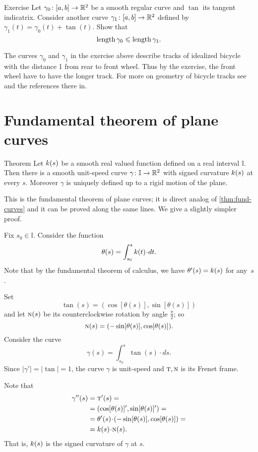 \begin{thm}{Exercise}\label{ex:bike}
Let $\gamma_0\colon[a,b]\to\mathbb{R}^2$ be a smooth regular curve and $\tan$ its tangent indicatrix.
Consider another curve $\gamma_1\colon[a,b]\to\mathbb{R}^2$ defined by $\gamma_1(t)=\gamma_0(t)+\tan(t)$.
Show that
\[\mathop{\rm length}\nolimits\gamma_0\leqslant \mathop{\rm length}\nolimits\gamma_1.\]

\end{thm}

The curves $\gamma_0$ and $\gamma_1$ in the exercise above describe tracks of idealized bicycle with the distance 1 from rear to front wheel.
Thus by the exercise, the front wheel have to have the longer track.
For more on geometry of bicycle tracks see \cite{FLT} and the references there in.

\section*{Fundamental theorem of plane curves}

\begin{thm}{Theorem}\label{thm:fund-curves-2D}
Let $k(s)$ be a smooth real valued function defined on a real interval $\mathbb{I}$.
Then there is a smooth unit-speed curve $\gamma\colon\mathbb{I}\to\mathbb{R}^2$ with signed curvature $k(s)$ at every $s$.
Moreover $\gamma$ is uniquely defined up to a rigid motion of the plane.
\end{thm}

This is the fundamental theorem of plane curves; it is direct analog of \ref{thm:fund-curves} and it can be proved along the same lines.
We give a slightly simpler proof.

Fix $s_0\in\mathbb{I}$.
Consider the function
\[\theta(s)=\int_{s_0}^s\skur(t)\cdot dt.\]
Note that by the fundamental theorem of calculus, we have $\theta'(s)\z=\skur(s)$ for any~$s$.

Set 
\[\tan(s)=(\cos[\theta(s)],\sin[\theta(s)])\] and let $\textsc{n}(s)$ be its counterclockwise rotation by angle $\tfrac\pi2$; so 
\[\textsc{n}(s)=(-\sin[\theta(s)],\cos[\theta(s)]).\]
Consider the curve 
\[\gamma(s)=\int_{s_0}^s\tan(s)\cdot ds.\]
Since $|\gamma'|=|\tan|=1$, the curve $\gamma$ is unit-speed and $\textsc{t},\textsc{n}$ is its Frenet frame. 

Note that
\begin{align*}
\gamma''(s)&=\tan'(s)=
\\
&=(\cos[\theta(s)]',\sin[\theta(s)]')=
\\
&=\theta'(s)\cdot (-\sin[\theta(s)],\cos[\theta(s)])=
\\
&=\skur(s)\cdot \norm(s).
\end{align*}
That is, $k(s)$ is the signed curvature of $\gamma$ at $s$.

